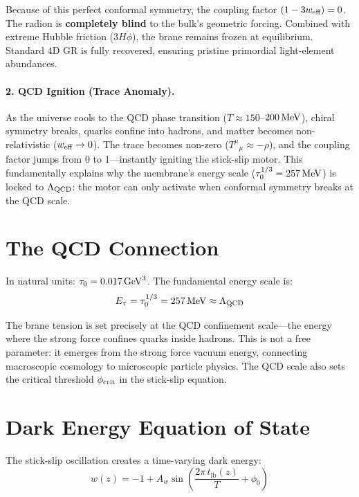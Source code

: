 Because of this perfect conformal symmetry, the coupling factor $(1 - 3w_\text{eff}) = 0$. The radion is \textbf{completely blind} to the bulk's geometric forcing. Combined with extreme Hubble friction ($3H\dot{\phi}$), the brane remains frozen at equilibrium. Standard 4D GR is fully recovered, ensuring pristine primordial light-element abundances.

\paragraph{2. QCD Ignition (Trace Anomaly).}
As the universe cools to the QCD phase transition ($T \approx 150$--$200\,\text{MeV}$), chiral symmetry breaks, quarks confine into hadrons, and matter becomes non-relativistic ($w_\text{eff} \to 0$). The trace becomes non-zero ($T^\mu{}_\mu \approx -\rho$), and the coupling factor jumps from 0 to 1---instantly igniting the stick-slip motor. This fundamentally explains why the membrane's energy scale ($\tau_0^{1/3} = 257\,\text{MeV}$) is locked to $\Lambda_\text{QCD}$: the motor can only activate when conformal symmetry breaks at the QCD scale.

\section{The QCD Connection}
\label{sec:qcd_connection}

In natural units: $\tau_0 = 0.017\,\text{GeV}^3$. The fundamental energy scale is:
\begin{equation}
E_\tau = \tau_0^{1/3} = 257\,\text{MeV} \approx \Lambda_\text{QCD}
\end{equation}

The brane tension is set precisely at the QCD confinement scale---the energy where the strong force confines quarks inside hadrons. This is not a free parameter: it emerges from the strong force vacuum energy, connecting macroscopic cosmology to microscopic particle physics. The QCD scale also sets the critical threshold $\phi_\text{crit}$ in the stick-slip equation.

\section{Dark Energy Equation of State}
\label{sec:dark_energy}

The stick-slip oscillation creates a time-varying dark energy:
\begin{equation}
w(z) = -1 + A_w \sin\!\left(\frac{2\pi\, t_\text{lb}(z)}{T} + \phi_0\right)
\end{equation}

